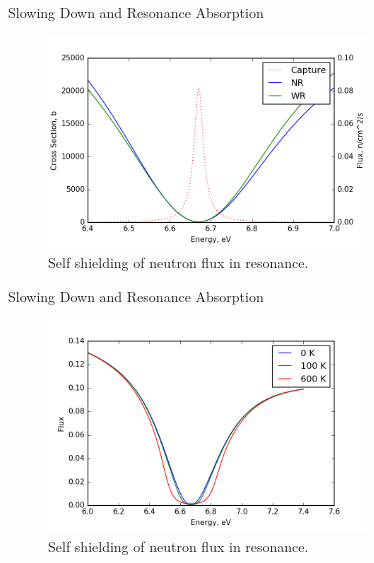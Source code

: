 \documentclass[presentation]{beamer}
\begin{document}
\begin{frame}[label={sec:orgheadline13}]{Slowing Down and Resonance Absorption}
\begin{figure}
  \centering
  \includegraphics[width=0.75\textwidth]{../notebooks/selfshielding.png}
  \caption{Self shielding of neutron flux in resonance.}
\end{figure}
\end{frame}

\begin{frame}[label={sec:orgheadline14}]{Slowing Down and Resonance Absorption}
\begin{figure}
  \centering
  \includegraphics[width=0.75\textwidth]{../notebooks/selfshielding_broadZoom.png}
  \caption{Self shielding of neutron flux in resonance.}
\end{figure}
\end{frame}
\end{document}
